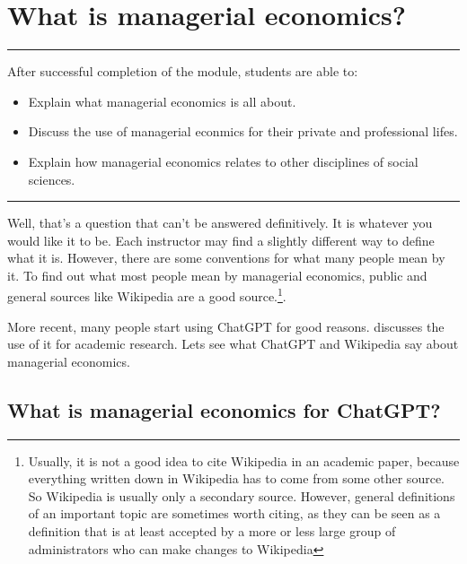\documentclass[
  12pt,
  oneside]{book}
\providecommand{\tightlist}{%
  \setlength{\itemsep}{0pt}\setlength{\parskip}{0pt}}
\theoremstyle{definition}
\theoremstyle{definition}
\theoremstyle{definition}
\theoremstyle{definition}
\theoremstyle{remark}
\begin{document}
\chapter{What is managerial economics?}\label{what-is-managerial-economics}

\begin{center}\rule{0.5\linewidth}{0.5pt}\end{center}

After successful completion of the module, students are able to:

\begin{itemize}
\tightlist
\item
  Explain what managerial economics is all about.
\item
  Discuss the use of managerial econmics for their private and professional lifes.
\item
  Explain how managerial economics relates to other disciplines of social sciences.
\end{itemize}

\begin{center}\rule{0.5\linewidth}{0.5pt}\end{center}

Well, that's a question that can't be answered definitively. It is whatever you would like it to be. Each instructor may find a slightly different way to define what it is. However, there are some conventions for what many people mean by it. To find out what most people mean by managerial economics, public and general sources like Wikipedia are a good source.\footnote{Usually, it is not a good idea to cite Wikipedia in an academic paper, because everything written down in Wikipedia has to come from some other source. So Wikipedia is usually only a secondary source. However, general definitions of an important topic are sometimes worth citing, as they can be seen as a definition that is at least accepted by a more or less large group of administrators who can make changes to Wikipedia}.

More recent, many people start using ChatGPT for good reasons. \citet{Korinek2023Language} discusses the use of it for academic research. Lets see what ChatGPT and Wikipedia say about managerial economics.

\section{What is managerial economics for ChatGPT?}\label{what-is-managerial-economics-for-chatgpt}
\end{document}
